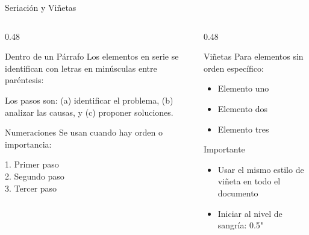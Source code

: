 \documentclass[spanish,aspectratio=169]{beamer}
\begin{document}
	\begin{frame}{Seriación y Viñetas}
		\begin{columns}[T]
			\begin{column}{0.48\textwidth}
				\begin{block}{Dentro de un Párrafo}
					Los elementos en serie se identifican con letras en minúsculas entre paréntesis:
					
					\vspace{0.2cm}
					Los pasos son: (a) identificar el problema, (b) analizar las causas, y (c) proponer soluciones.
				\end{block}
				
				\begin{block}{Numeraciones}
					Se usan cuando hay orden o importancia:
					
					\vspace{0.2cm}
					1. Primer paso\\
					2. Segundo paso\\
					3. Tercer paso
				\end{block}
			\end{column}
			
			\begin{column}{0.48\textwidth}
				\begin{block}{Viñetas}
					Para elementos sin orden específico:
					
					\vspace{0.2cm}
					\begin{itemize}
						\item Elemento uno
						\item Elemento dos
						\item Elemento tres
					\end{itemize}
				\end{block}
				
				\begin{alertblock}{Importante}
					\begin{itemize}
						\item Usar el mismo estilo de viñeta en todo el documento
						\item Iniciar al nivel de sangría: 0.5"
					\end{itemize}
				\end{alertblock}
			\end{column}
		\end{columns}
	\end{frame}
	
\end{document}
